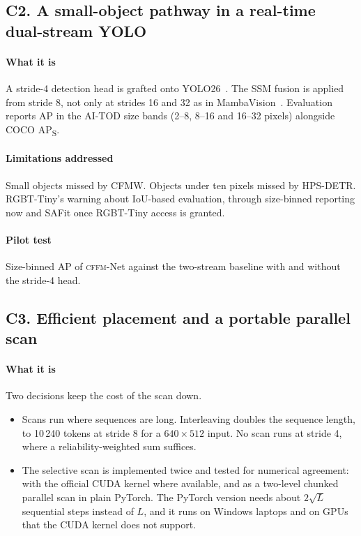\documentclass[11pt,a4paper]{article}
\newcommand{\method}{\textsc{cffm}-Net}
\begin{document}
\subsection*{C2. A small-object pathway in a real-time dual-stream YOLO}

\paragraph{What it is}
A stride-4 detection head is grafted onto YOLO26~\citep{yolo26_2026}. The SSM fusion
is applied from stride 8, not only at strides 16 and 32 as in
MambaVision~\citep{hatamizadeh2025mambavision}. Evaluation reports AP in the AI-TOD
size bands (2--8, 8--16 and 16--32 pixels) alongside COCO AP\textsubscript{S}.

\paragraph{Limitations addressed}
Small objects missed by CFMW. Objects under ten pixels missed by HPS-DETR.
RGBT-Tiny's warning about IoU-based evaluation, through size-binned reporting now and
SAFit once RGBT-Tiny access is granted.

\paragraph{Pilot test}
Size-binned AP of \method{} against the two-stream baseline with and without the
stride-4 head.

\subsection*{C3. Efficient placement and a portable parallel scan}

\paragraph{What it is}
Two decisions keep the cost of the scan down.
\begin{itemize}
  \item Scans run where sequences are long. Interleaving doubles the sequence length,
        to 10\,240 tokens at stride 8 for a $640\times512$ input. No scan runs at
        stride 4, where a reliability-weighted sum suffices.
  \item The selective scan is implemented twice and tested for numerical agreement:
        with the official CUDA kernel where available, and as a two-level chunked
        parallel scan in plain PyTorch. The PyTorch version needs about
        $2\sqrt{L}$ sequential steps instead of $L$, and it runs on Windows laptops
        and on GPUs that the CUDA kernel does not support.
\end{itemize}
\end{document}
